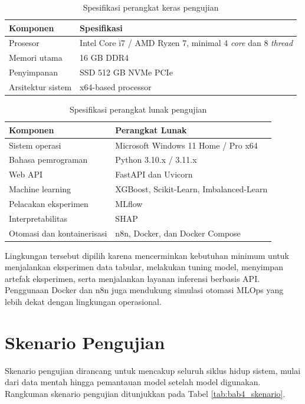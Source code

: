 \begin{table}[H]
\centering
\caption{Spesifikasi perangkat keras pengujian}
\label{tab:bab4_hardware}
\begin{tabular}{|l|l|}
\hline
\textbf{Komponen} & \textbf{Spesifikasi} \\
\hline
Prosesor & Intel Core i7 / AMD Ryzen 7, minimal 4 \textit{core} dan 8 \textit{thread} \\
\hline
Memori utama & 16 GB DDR4 \\
\hline
Penyimpanan & SSD 512 GB NVMe PCIe \\
\hline
Arsitektur sistem & x64-based processor \\
\hline
\end{tabular}
\end{table}

\begin{table}[H]
\centering
\caption{Spesifikasi perangkat lunak pengujian}
\label{tab:bab4_software}
\begin{tabular}{|l|l|}
\hline
\textbf{Komponen} & \textbf{Perangkat Lunak} \\
\hline
Sistem operasi & Microsoft Windows 11 Home / Pro x64 \\
\hline
Bahasa pemrograman & Python 3.10.x / 3.11.x \\
\hline
Web API & FastAPI dan Uvicorn \\
\hline
Machine learning & XGBoost, Scikit-Learn, Imbalanced-Learn \\
\hline
Pelacakan eksperimen & MLflow \\
\hline
Interpretabilitas & SHAP \\
\hline
Otomasi dan kontainerisasi & n8n, Docker, dan Docker Compose \\
\hline
\end{tabular}
\end{table}

Lingkungan tersebut dipilih karena mencerminkan kebutuhan minimum untuk menjalankan eksperimen data tabular, melakukan tuning model, menyimpan artefak eksperimen, serta menjalankan layanan inferensi berbasis API. Penggunaan Docker dan n8n juga mendukung simulasi otomasi MLOps yang lebih dekat dengan lingkungan operasional.

\section{Skenario Pengujian}
\label{sec:bab4_skenario_pengujian}
Skenario pengujian dirancang untuk mencakup seluruh siklus hidup sistem, mulai dari data mentah hingga pemantauan model setelah model digunakan. Rangkuman skenario pengujian ditunjukkan pada Tabel \ref{tab:bab4_skenario}.

